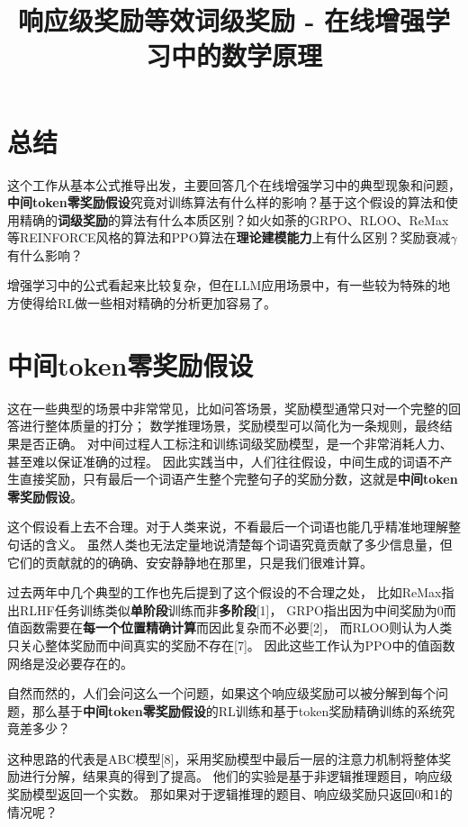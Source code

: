 \documentclass[11pt,english]{ctexart}
\begin{document}
\title{响应级奖励等效词级奖励 - 在线增强学习中的数学原理}

\maketitle

\section{总结}

这个工作从基本公式推导出发，主要回答几个在线增强学习中的典型现象和问题，\textbf{中间token零奖励假设}究竟对训练算法有什么样的影响？基于这个假设的算法和使用精确的\textbf{词级奖励}的算法有什么本质区别？如火如荼的GRPO、RLOO、ReMax等REINFORCE风格的算法和PPO算法在\textbf{理论建模能力}上有什么区别？奖励衰减$\gamma$有什么影响？

增强学习中的公式看起来比较复杂，但在LLM应用场景中，有一些较为特殊的地方使得给RL做一些相对精确的分析更加容易了。

\section{\textbf{中间token零奖励假设}}

这在一些典型的场景中非常常见，比如问答场景，奖励模型通常只对一个完整的回答进行整体质量的打分；
数学推理场景，奖励模型可以简化为一条规则，最终结果是否正确。
对中间过程人工标注和训练词级奖励模型，是一个非常消耗人力、甚至难以保证准确的过程。
因此实践当中，人们往往假设，中间生成的词语不产生直接奖励，只有最后一个词语产生整个完整句子的奖励分数，这就是\textbf{中间token零奖励假设}。

这个假设看上去不合理。对于人类来说，不看最后一个词语也能几乎精准地理解整句话的含义。
虽然人类也无法定量地说清楚每个词语究竟贡献了多少信息量，但它们的贡献就的的确确、安安静静地在那里，只是我们很难计算。

过去两年中几个典型的工作也先后提到了这个假设的不合理之处，
比如ReMax指出RLHF任务训练类似\textbf{单阶段}训练而非\textbf{多阶段}[1]，
GRPO指出因为中间奖励为0而值函数需要在\textbf{每一个位置精确计算}而因此复杂而不必要[2]，
而RLOO则认为人类只关心整体奖励而中间真实的奖励不存在[7]。
因此这些工作认为PPO中的值函数网络是没必要存在的。

自然而然的，人们会问这么一个问题，如果这个响应级奖励可以被分解到每个问题，那么基于\textbf{中间token零奖励假设}的RL训练和基于token奖励精确训练的系统究竟差多少？

这种思路的代表是ABC模型[8]，采用奖励模型中最后一层的注意力机制将整体奖励进行分解，结果真的得到了提高。
他们的实验是基于非逻辑推理题目，响应级奖励模型返回一个实数。
那如果对于逻辑推理的题目、响应级奖励只返回0和1的情况呢？
\end{document}
